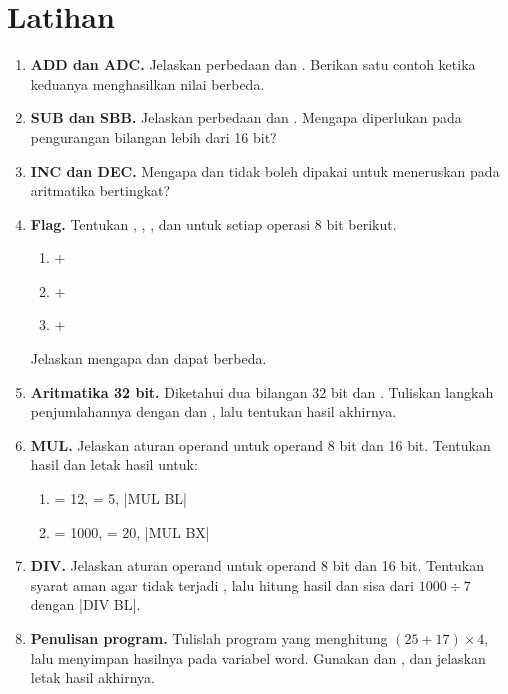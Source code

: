 \section{Latihan}
\label{sec:latihan-bab10}

\begin{enumerate}
    \item \textbf{ADD dan ADC.} Jelaskan perbedaan  dan
          . Berikan satu contoh ketika keduanya menghasilkan
          nilai berbeda.

    \item \textbf{SUB dan SBB.} Jelaskan perbedaan  dan
          . Mengapa  diperlukan pada pengurangan
          bilangan lebih dari 16 bit?

    \item \textbf{INC dan DEC.} Mengapa  dan 
          tidak boleh dipakai untuk meneruskan  pada
          aritmatika bertingkat?

    \item \textbf{Flag.} Tentukan , , ,
          dan  untuk setiap operasi 8 bit berikut.
          \begin{enumerate}
              \item {} + 
              \item {} + 
              \item {} + 
          \end{enumerate}
          Jelaskan mengapa  dan  dapat berbeda.

    \item \textbf{Aritmatika 32 bit.} Diketahui dua bilangan 32 bit
           dan . Tuliskan langkah
          penjumlahannya dengan  dan , lalu
          tentukan hasil akhirnya.

    \item \textbf{MUL.} Jelaskan aturan operand  untuk
          operand 8 bit dan 16 bit. Tentukan hasil dan letak hasil
          untuk:
          \begin{enumerate}
              \item {} = 12,  = 5, \lstasm|MUL BL|
              \item {} = 1000,  = 20, \lstasm|MUL BX|
          \end{enumerate}

    \item \textbf{DIV.} Jelaskan aturan operand  untuk
          operand 8 bit dan 16 bit. Tentukan syarat aman agar tidak
          terjadi , lalu hitung hasil dan sisa
          dari $1000 \div 7$ dengan \lstasm|DIV BL|.

    \item \textbf{Penulisan program.} Tulislah program yang
          menghitung $(25 + 17) \times 4$, lalu menyimpan hasilnya
          pada variabel word. Gunakan  dan , dan
          jelaskan letak hasil akhirnya.
\end{enumerate}

